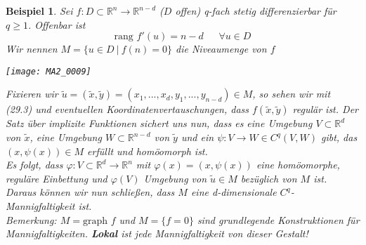 \documentclass[a4paper,12pt,portrait]{book}
\newcommand{\graph}{\text{graph\ }}
\newcommand{\rang}{\text{rang\ }}
\theoremstyle{theoremstyle}
\newtheorem{beispiel}[theo]{Beispiel}
\begin{document}
\begin{beispiel}
Sei $f:D\subset\mathbb{R}^n\rightarrow\mathbb{R}^{n-d}$ ($D$ offen) q-fach stetig differenzierbar für $q\geq 1$. Offenbar ist
\begin{equation}
\rang f'(u)=n-d \ \ \ \ \ \ \ \forall u\in D
\end{equation}
Wir nennen $M=\{u\in D \ | \ f(n)=0\}$ die Niveaumenge von $f$\\
\begin{center}\texttt{[image: MA2\_0009]}\\
\end{center}
Fixieren wir $\tilde{u}=(\tilde{x},\tilde{y})=(x_1,...,x_d,y_1,...,y_{n-d})\in M$, so sehen wir mit (29.3) und eventuellen Koordinatenvertauschungen, dass $f(\tilde{x},\tilde{y})$ regulär ist. Der \emph{Satz über implizite Funktionen} sichert uns nun, dass es eine Umgebung $V\subset\mathbb{R}^d$ von $\tilde{x}$, eine Umgebung $W\subset\mathbb{R}^{n-d}$ von $\tilde{y}$ und ein $\psi:V\rightarrow W\in C^q(V,W)$ gibt, das $(x,\psi(x))\in M$ erfüllt und homöomorph ist.\\
Es folgt, dass $\varphi:V\subset\mathbb{R}^d\rightarrow\mathbb{R}^n$ mit $\varphi(x)=(x,\psi(x))$ eine homöomorphe, reguläre Einbettung  und $\varphi(V)$ Umgebung von $\tilde{u}\in M$ bezüglich von $M$ ist. Daraus können wir nun schließen, dass $M$ eine d-dimensionale $C^q$-Mannigfaltigkeit ist.\\
\linebreak
\emph{Bemerkung: $M=\graph f$ und $M=\{f=0\}$ sind grundlegende Konstruktionen für Mannigfaltigkeiten. \textbf{Lokal} ist jede Mannigfaltigkeit von dieser Gestalt!}
\end{beispiel}
\end{document}
